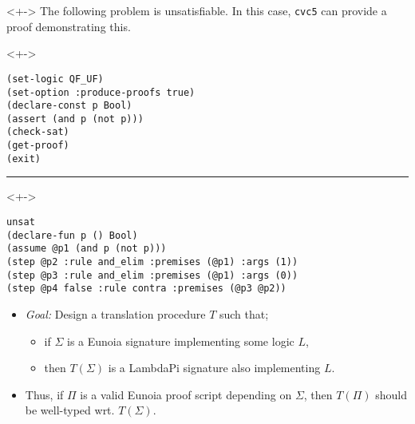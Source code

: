 \documentclass[lualatex, compress, 12pt, handout]{beamer}
\begin{document}
\begin{frame}
	\begin{uncoverenv}<+->
		\exxample
		The following problem is \alert{unsatisfiable}.
		In this case, \texttt{cvc5} can provide a \alert{proof} demonstrating this.
	\end{uncoverenv}
	\begin{uncoverenv}<+->
		\begin{lstlisting}[basicstyle=\ttfamily\footnotesize]
(set-logic QF_UF)
(set-option :produce-proofs true)
(declare-const p Bool)
(assert (and p (not p)))
(check-sat)
(get-proof)
(exit)\end{lstlisting}
	\end{uncoverenv}
	\hrule
	\begin{uncoverenv}<+->
		\begin{lstlisting}[basicstyle=\ttfamily\footnotesize]
unsat
(declare-fun p () Bool)
(assume @p1 (and p (not p)))
(step @p2 :rule and_elim :premises (@p1) :args (1))
(step @p3 :rule and_elim :premises (@p1) :args (0))
(step @p4 false :rule contra :premises (@p3 @p2))\end{lstlisting}
	\end{uncoverenv}
\end{frame}


\begin{frame}{}
	\begin{itemize}
		\item<+-> \emph{\color{oc-green-9}Goal:}
		      Design a translation procedure $T$ such that;
		      \begin{itemize}
			      \item<+-> if $Σ$ is a Eunoia signature implementing some \alert{logic} $L$,
			      \item<+-> then $T(Σ)$ is a LambdaPi signature also implementing $L$.
			            \\[2mm]
		      \end{itemize}

		\item<+-> Thus, if $Π$ is a valid Eunoia \alert{proof script} depending on $Σ$,
		      then $T(Π)$ should be \alert{well-typed} wrt. $T(Σ)$.
	\end{itemize}
\end{frame}
\end{document}
